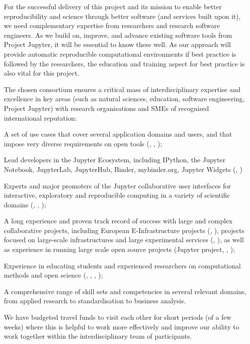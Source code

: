 For the successful delivery of this project and its mission to enable better
reproducibility and science through better software (and services built upon it),
we need complementary expertise from researchers and research software
engineers. As we build on, improve, and advance existing software tools from
Project Jupyter, it will be essential to know these well. As our approach will
provide automatic reproducible computational environments if best practice is
followed by the researchers, the education and training aspect for best practice
is also vital for this project.

The chosen consortium ensures a critical mass of interdisciplinary expertise and
excellence in key areas (such as natural sciences, education, software
engineering, Project Jupyter) with research organisations and SMEs of recognised
international reputation:
\begin{compactitem}
\item A set of use cases that cover several application domains and users, and that impose very diverse
requirements on open tools (, , );
\item Lead developers in the Jupyter Ecosystem, including IPython, the Jupyter Notebook, JupyterLab,
JupyterHub, Binder, mybinder.org, Jupyter Widgets (, )
\item Experts and major promoters of the Jupyter collaborative user interfaces
  for interactive, exploratory and reproducible computing in a variety of scientific domains (, , );
\item A long experience and proven track record of success with large and complex collaborative projects,
including European E-Infrastructure projects (, ),
projects focused on large-scale infrastructures and large experimental services (, ),
as well as experience in running large scale open source projects (Jupyter
project, , );
\item Experience in educating students and experienced researchers on
  computational methods and open science (, , , );
\item A comprehensive range of skill sets and competencies in several relevant domains,
from applied research to standardisation to business analysis.
\end{compactitem}

We have budgeted travel funds to visit each other for short periods (of a few
weeks) where this is helpful to work more effectively and improve our ability to
work together within the interdisciplinary team of participants.

